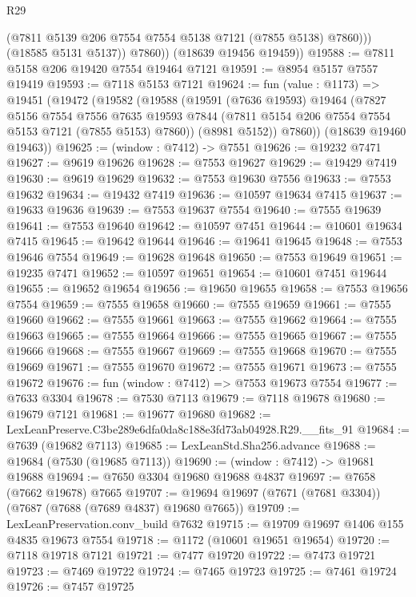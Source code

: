 \begin{lexlean}{R29}
\begin{coremodule}
                (@7811 @5139 @206 @7554 @7554 @5138 @7121 (@7855 @5138) @7860)))
            (@18585 @5131 @5137))
          @7860))
      (@18639 @19456 @19459))
@19588 := @7811 @5158 @206 @19420 @7554 @19464 @7121
@19591 := @8954 @5157 @7557 @19419
@19593 := @7118 @5153 @7121
@19624 := fun (value : @1173) =>
  @19451
    (@19472
      (@19582
        (@19588
          (@19591
            (@7636 @19593)
            @19464
            (@7827
              @5156
              @7554
              @7556
              @7635
              @19593
              @7844
              (@7811 @5154 @206 @7554 @7554 @5153 @7121 (@7855 @5153) @7860))
            (@8981 @5152))
          @7860))
      (@18639 @19460 @19463))
@19625 := (window : @7412) -> @7551
@19626 := @19232 @7471
@19627 := @9619 @19626
@19628 := @7553 @19627
@19629 := @19429 @7419
@19630 := @9619 @19629
@19632 := @7553 @19630 @7556
@19633 := @7553 @19632
@19634 := @19432 @7419
@19636 := @10597 @19634 @7415
@19637 := @19633 @19636
@19639 := @7553 @19637 @7554
@19640 := @7555 @19639
@19641 := @7553 @19640
@19642 := @10597 @7451
@19644 := @10601 @19634 @7415
@19645 := @19642 @19644
@19646 := @19641 @19645
@19648 := @7553 @19646 @7554
@19649 := @19628 @19648
@19650 := @7553 @19649
@19651 := @19235 @7471
@19652 := @10597 @19651
@19654 := @10601 @7451 @19644
@19655 := @19652 @19654
@19656 := @19650 @19655
@19658 := @7553 @19656 @7554
@19659 := @7555 @19658
@19660 := @7555 @19659
@19661 := @7555 @19660
@19662 := @7555 @19661
@19663 := @7555 @19662
@19664 := @7555 @19663
@19665 := @7555 @19664
@19666 := @7555 @19665
@19667 := @7555 @19666
@19668 := @7555 @19667
@19669 := @7555 @19668
@19670 := @7555 @19669
@19671 := @7555 @19670
@19672 := @7555 @19671
@19673 := @7555 @19672
@19676 := fun (window : @7412) => @7553 @19673 @7554
@19677 := @7633 @3304
@19678 := @7530 @7113
@19679 := @7118 @19678
@19680 := @19679 @7121
@19681 := @19677 @19680
@19682 := LexLeanPreserve.C3be289e6dfa0da8c188e3fd73ab04928.R29.__fits_91
@19684 := @7639 (@19682 @7113)
@19685 := LexLeanStd.Sha256.advance
@19688 := @19684 (@7530 (@19685 @7113))
@19690 := (window : @7412) -> @19681 @19688
@19694 := @7650 @3304 @19680 @19688 @4837
@19697 := @7658 (@7662 @19678) @7665
@19707 := @19694 @19697 (@7671 (@7681 @3304)) (@7687 (@7688 (@7689 @4837) @19680 @7665))
@19709 := LexLeanPreservation.conv_build @7632
@19715 := @19709 @19697 @1406 @155 @4835 @19673 @7554
@19718 := @1172 (@10601 @19651 @19654)
@19720 := @7118 @19718 @7121
@19721 := @7477 @19720
@19722 := @7473 @19721
@19723 := @7469 @19722
@19724 := @7465 @19723
@19725 := @7461 @19724
@19726 := @7457 @19725

\end{coremodule}
\end{lexlean}
